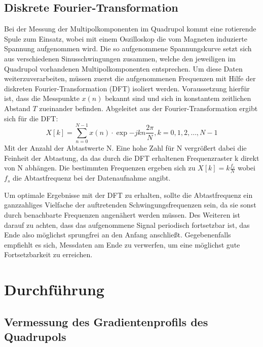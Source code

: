 \documentclass[bigchapter,colorback,accentcolor=tud4b,linedtoc,11pt]{tudreport}
\begin{document}
\section{Diskrete Fourier-Transformation}
Bei der Messung der Multipolkomponenten im Quadrupol kommt eine rotierende Spule zum Einsatz, wobei mit einem Oszilloskop die vom Magneten induzierte Spannung aufgenommen wird. Die so aufgenommene Spannungskurve setzt sich aus verschiedenen Sinusschwingungen zusammen, welche den jeweiligen im Quadrupol vorhandenen Multipolkomponenten entsprechen. Um diese Daten weiterzuverarbeiten, müssen zuerst die aufgenommenen Frequenzen mit Hilfe der diskreten Fourier-Transformation (DFT) isoliert werden. Voraussetzung hierfür ist, dass die Messpunkte $x(n)$ bekannt sind und sich in konstantem zeitlichen Abstand $T$ zueinander befinden. Abgeleitet aus der Fourier-Transformation ergibt sich für die DFT:
$$X[k]= \sum_{n=0}^{N-1} x\left( n \right) \cdot \exp{-jkn \frac{2\pi}{N}}, k = 0, 1, 2, \dots, N-1$$
Mit der Anzahl der Abtastwerte N. Eine hohe Zahl für N vergrößert dabei die Feinheit der Abtastung, da das durch die DFT erhaltenen Frequenzraster k direkt von N abhängen. Die bestimmten Frequenzen ergeben sich zu 
$X[k]=k\frac{f_s}{N}$
wobei $f_s$ die Abtastfrequenz bei der Datenaufnahme angibt.

Um optimale Ergebnisse mit der DFT zu erhalten, sollte die Abtastfrequenz ein ganzzahliges Vielfache der auftretenden Schwingungsfrequenzen sein, da sie sonst durch benachbarte Frequenzen angenähert werden müssen. Des Weiteren ist darauf zu achten, dass das aufgenommene Signal periodisch fortsetzbar ist, das Ende also möglichst sprungfrei an den Anfang anschließt. Gegebenenfalls empfiehlt es sich, Messdaten am Ende zu verwerfen, um eine möglichst gute Fortsetzbarkeit zu erreichen.
\chapter{Durchführung}
\section{Vermessung des Gradientenprofils des Quadrupols}
\end{document}
